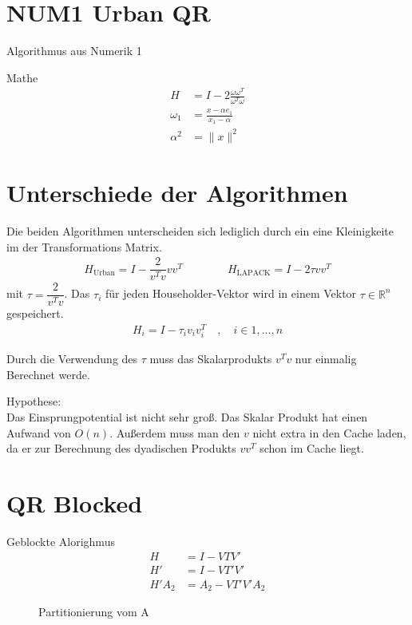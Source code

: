 \section{NUM1 Urban QR}
Algorithmus aus Numerik 1

Mathe
\begin{align}
	H &= I - 2 \frac{\omega \omega^T}{\omega^T \omega}\\
	\omega_1 &= \frac{x - \alpha e_1}{x_1 - \alpha}\\
	\alpha ^2 &= \|x\|^2 
\end{align}


\section{Unterschiede der Algorithmen}
Die beiden Algorithmen unterscheiden sich lediglich durch ein eine Kleinigkeite im der Transformations Matrix.
\begin{align*}
	H_{\text{Urban}} = I -  \dfrac{2}{v^T v}v v^T \qquad \qquad H_{\text{LAPACK}} = I - 2 \tau v v^T
\end{align*}
mit $\tau = \dfrac{2}{v^T v}$. Das $\tau_i$ für jeden Householder-Vektor wird in einem Vektor $\tau \in \mathbb{R}^n$ gespeichert.
\begin{align*}
	H_i = I - \tau_i v_i v_i^T \quad , \quad i \in 1,...,n
\end{align*}

Durch die Verwendung des $\tau$ muss das Skalarprodukts $v^T v$  nur einmalig Berechnet werde.

Hypothese:\\
Das Einsprungpotential ist nicht sehr groß.
Das Skalar Produkt hat einen Aufwand von $O(n)$. Außerdem muss man den $v$ nicht extra in den Cache laden, da er zur Berechnung des dyadischen Produkts $vv^T$ schon im Cache liegt.



\section{QR Blocked}
Geblockte Alorighmus
\begin{align}
H &= I - VTV'\\
H' &= I - VT'V'\\ 
H'A_2 &= A_2 - VT'V'A_2
\end{align}



\begin{figure}
	\centering
	
	\caption{Partitionierung vom A}
	\label{fig:blockA}
\end{figure}





